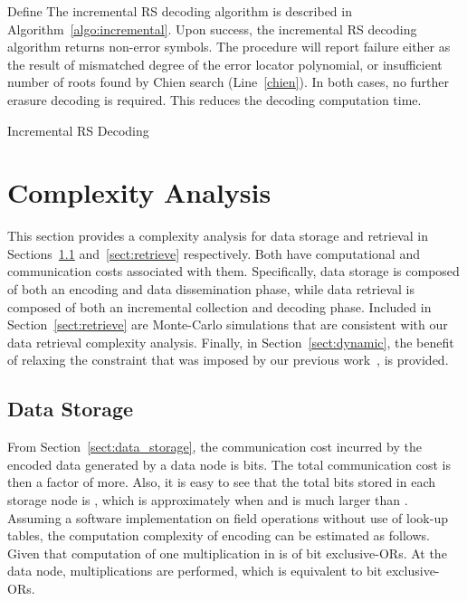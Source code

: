 \documentclass[10pt,journal,letterpaper,compsoc]{IEEEtran}
\newcommand{\0}{{\bf 0}}
\begin{document}
Define  The
incremental RS decoding algorithm is described in
Algorithm~\ref{algo:incremental}. Upon success, the incremental RS decoding
algorithm returns  non-error symbols. The procedure will report failure either as the result
of mismatched degree of the error locator polynomial, or insufficient number of
roots found by Chien search (Line~\ref{chien}). In both cases, no further erasure decoding is
required.  This reduces the decoding computation time.
\begin{algorithm}[h]
\SetLine
{}
\label{algo:incremental}
\caption{Incremental RS Decoding }
\end{algorithm}
\section{Complexity Analysis}
\label{sect:complexity}
This section provides a complexity analysis for data storage and retrieval in Sections~\ref{sect:enc_comm}
and~\ref{sect:retrieve} respectively. Both have computational and communication costs associated with them. Specifically, data
storage is composed of both an encoding and data dissemination phase, while data retrieval is composed of both an incremental collection
and decoding phase.
Included in 
Section~\ref{sect:retrieve} are Monte-Carlo simulations that are consistent with our data retrieval complexity analysis.
 Finally, in Section~\ref{sect:dynamic}, the benefit of relaxing the
 constraint that was imposed by our previous work~\cite{Han10-Infocom}, is provided.

\subsection{Data Storage}
\label{sect:enc_comm}
From Section~\ref{sect:data_storage}, the  communication cost incurred by the encoded data generated by a
data node is  bits. The total communication cost 
is then a factor of  more.
Also, it is easy to see that the total bits stored in each storage node is
, which is approximately
 when  and  is much larger than . 
Assuming a software implementation on field operations without use of look-up tables,
the computation complexity of encoding can be estimated as follows. 
Given that computation of one multiplication in  is of  bit
exclusive-ORs. At the data node,  multiplications are performed, which is equivalent
to  bit exclusive-ORs.
\end{document}

